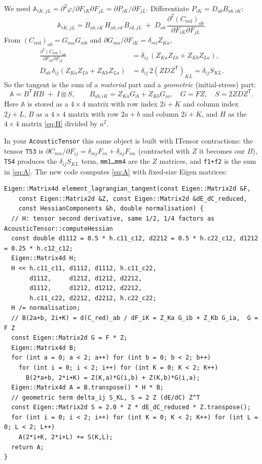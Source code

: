 \documentclass[11pt,a4paper]{article}
\theoremstyle{remark}
\newcommand{\Cred}{C_{\mathrm{red}}}
\newcommand{\T}{^{\mathsf T}}
\newcommand{\code}[1]{\texttt{#1}}
\begin{document}
We need $\mathbb{A}_{iK,jL} = \partial^2\varphi/\partial F_{iK}\partial F_{jL} = \partial P_{iK}/\partial F_{jL}$.
Differentiate $P_{iK} = D_{ab}B_{ab,iK}$:
\begin{equation}
\mathbb{A}_{iK,jL} = B_{ab,iK}\,H_{ab,cd}\,B_{cd,jL} \;+\; D_{ab}\,\frac{\partial^2(\Cred)_{ab}}{\partial F_{iK}\partial F_{jL}} .
\end{equation}
From $(\Cred)_{ab}=G_{ma}G_{mb}$ and $\partial G_{ma}/\partial F_{iK} = \delta_{mi}Z_{Ka}$,
\begin{align*}
\frac{\partial^2(\Cred)_{ab}}{\partial F_{iK}\partial F_{jL}} &= \delta_{ij}\,(Z_{Ka}Z_{Lb}+Z_{Kb}Z_{La}),\\
D_{ab}\,\delta_{ij}(Z_{Ka}Z_{Lb}+Z_{Kb}Z_{La}) &= \delta_{ij}\,2(ZDZ\T)_{KL} = \delta_{ij}S_{KL}.
\end{align*}
So the tangent is the sum of a \emph{material} part and a \emph{geometric} (initial-stress)
part:
\begin{equation}
\boxed{\;\mathbb{A} = B\T H B \;+\; I\otimes S,\qquad
B_{ab,iK} = Z_{Ka}G_{ib}+Z_{Kb}G_{ia},\quad G=FZ,\quad S=2ZDZ\T.\;}
\label{eq:A}
\end{equation}
Here $\mathbb{A}$ is stored as a $4\times4$ matrix with row index $2i+K$ and column index
$2j+L$, $B$ as a $4\times4$ matrix with row $2a+b$ and column $2i+K$, and $H$ as the
$4\times4$ matrix \eqref{eq:H} divided by $a^2$.

In your \code{AcousticTensor} this same object is built with ITensor contractions: the
tensor \code{T53} is $\partial C_{mn}/\partial F_{ij} = \delta_{mj}F_{in}+\delta_{nj}F_{im}$ (contracted
with $Z$ it becomes our $B$), \code{T54} produces the $\delta_{ij}S_{KL}$ term, \code{mm1\dots mm4}
are the $Z$ matrices, and \code{f1+f2} is the sum in \eqref{eq:A}. The new code computes
\eqref{eq:A} with fixed-size Eigen matrices:
\begin{lstlisting}
Eigen::Matrix4d element_lagrangian_tangent(const Eigen::Matrix2d &F,
    const Eigen::Matrix2d &Z, const Eigen::Matrix2d &dE_dC_reduced,
    const HessianComponents &h, double normalisation) {
  // H: tensor second derivative, same 1/2, 1/4 factors as AcousticTensor::computeHessian
  const double d1112 = 0.5 * h.c11_c12, d2212 = 0.5 * h.c22_c12, d1212 = 0.25 * h.c12_c12;
  Eigen::Matrix4d H;
  H << h.c11_c11, d1112, d1112, h.c11_c22,
       d1112,     d1212, d1212, d2212,
       d1112,     d1212, d1212, d2212,
       h.c11_c22, d2212, d2212, h.c22_c22;
  H /= normalisation;
  // B(2a+b, 2i+K) = d(C_red)_ab / dF_iK = Z_Ka G_ib + Z_Kb G_ia,  G = F Z
  const Eigen::Matrix2d G = F * Z;
  Eigen::Matrix4d B;
  for (int a = 0; a < 2; a++) for (int b = 0; b < 2; b++)
    for (int i = 0; i < 2; i++) for (int K = 0; K < 2; K++)
      B(2*a+b, 2*i+K) = Z(K,a)*G(i,b) + Z(K,b)*G(i,a);
  Eigen::Matrix4d A = B.transpose() * H * B;
  // geometric term delta_ij S_KL, S = 2 Z (dE/dC) Z^T
  const Eigen::Matrix2d S = 2.0 * Z * dE_dC_reduced * Z.transpose();
  for (int i = 0; i < 2; i++) for (int K = 0; K < 2; K++) for (int L = 0; L < 2; L++)
    A(2*i+K, 2*i+L) += S(K,L);
  return A;
}
\end{lstlisting}
\end{document}
